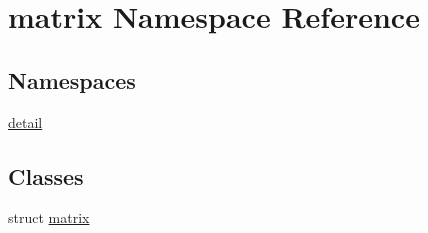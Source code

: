 \hypertarget{namespacematrix}{}\section{matrix Namespace Reference}
\label{namespacematrix}
\subsection*{Namespaces}
\begin{DoxyCompactItemize}
\item 
 \hyperlink{namespacematrix_1_1detail}{detail}
\end{DoxyCompactItemize}
\subsection*{Classes}
\begin{DoxyCompactItemize}
\item 
struct \hyperlink{structmatrix_1_1matrix}{matrix}
\end{DoxyCompactItemize}
